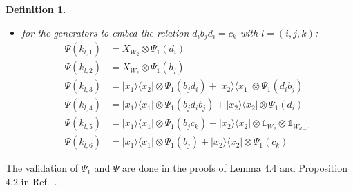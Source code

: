 \documentclass[11pt,letterpaper]{article}
\newcommand{\ketbra}[2]{|#1\rangle\langle#2|}
\newcommand{\x}{\otimes}
\newcommand{\1}{\mathbb{1}}
\newtheorem{definition}[theorem]{Definition}
\theoremstyle{definition}
\begin{document}
\begin{definition}
\begin{itemize}
\begin{align*}
	\Psi(k_{i,4}) &=  \ketbra{x_1}{x_1} \x \Psi_1(b_ic_i) + \ketbra{x_2}{x_2} \x \1_{W_2} \x \1_{W_{d-1}}\\
	\Psi(k_{i,5}) &= \ketbra{x_1}{x_1} \x \Psi_1(b_i) + \ketbra{x_2}{x_2} \x \Psi_1(c_i) 
\end{align*}
\item for the generators to embed the relation $d_i b_j d_i = c_k$ with $l = (i,j,k)$:
\begin{align*}
	\Psi(k_{l,1}) &= X_{W_2} \x \Psi_1(d_i) \\
	\Psi(k_{l,2}) &= X_{W_2} \x \Psi_1(b_j) \\
	\Psi(k_{l,3}) &= \ketbra{x_1}{x_2} \x  \Psi_1(b_jd_i) + \ketbra{x_2}{x_1} \x \Psi_1(d_ib_j)\\
	\Psi(k_{l,4}) &= \ketbra{x_1}{x_1} \x \Psi_1(b_jd_ib_j) + \ketbra{x_2}{x_2} \x  \Psi_1(d_i)\\
	\Psi(k_{l,5}) &=  \ketbra{x_1}{x_1} \x \Psi_1(b_jc_k) + \ketbra{x_2}{x_2} \x \1_{W_2} \x \1_{W_{d-1}}\\
	\Psi(k_{l,6}) &= \ketbra{x_1}{x_1} \x \Psi_1(b_j) + \ketbra{x_2}{x_2} \x \Psi_1(c_{k})
\end{align*}
\end{itemize}
\end{definition}
The validation of $\Psi_1$ and $\Psi$ are done in the proofs of Lemma $4.4$ and Proposition $4.2$ in Ref.~\cite{slofstra2017}.
\end{document}
